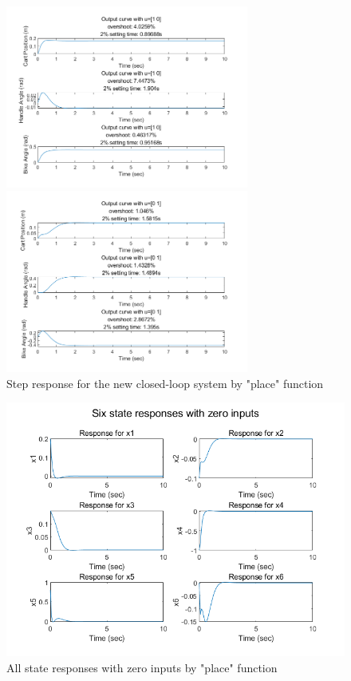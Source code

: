 \documentclass[hyperref]{article}
\theoremstyle{nonumberplain}
\begin{document}
	\begin{figure}[H]
		\centering
		\begin{minipage}[t]{0.48\textwidth}
			\centering
			\includegraphics[width=8cm]{fig5.png}
		\end{minipage}
		\begin{minipage}[t]{0.48\textwidth}
			\centering
			\includegraphics[width=8cm]{fig6.png}
		\end{minipage}
		\caption{Step response for the new closed-loop system by "place" function}
		\label{fig6}
	\end{figure}

	\begin{figure}[H]
		\centering
		\includegraphics[width=0.6\linewidth]{fig7.png}
		\caption{All state responses with zero inputs by "place" function}
		\label{fig7}
	\end{figure} 
	
\end{document}
